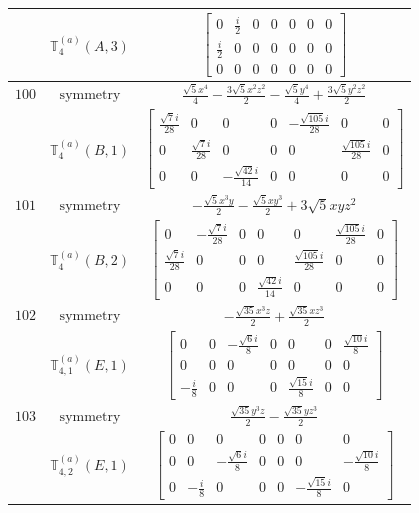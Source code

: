 \documentclass[fleqn,8pt,landscape]{jsarticle}
\begin{document}
\begin{longtable}{ccc}
$  $ & $ \mathbb{T}_{4}^{(a)}(A,3) $ & $ \begin{bmatrix} 0 & \frac{i}{2} & 0 & 0 & 0 & 0 & 0 \\ \frac{i}{2} & 0 & 0 & 0 & 0 & 0 & 0 \\ 0 & 0 & 0 & 0 & 0 & 0 & 0 \end{bmatrix} $ \\ \hline
$ 100 $ & $ \text{symmetry} $ & $ \frac{\sqrt{5} x^{4}}{4} - \frac{3 \sqrt{5} x^{2} z^{2}}{2} - \frac{\sqrt{5} y^{4}}{4} + \frac{3 \sqrt{5} y^{2} z^{2}}{2} $ \\
$  $ & $ \mathbb{T}_{4}^{(a)}(B,1) $ & $ \begin{bmatrix} \frac{\sqrt{7} i}{28} & 0 & 0 & 0 & - \frac{\sqrt{105} i}{28} & 0 & 0 \\ 0 & \frac{\sqrt{7} i}{28} & 0 & 0 & 0 & \frac{\sqrt{105} i}{28} & 0 \\ 0 & 0 & - \frac{\sqrt{42} i}{14} & 0 & 0 & 0 & 0 \end{bmatrix} $ \\ \hline
$ 101 $ & $ \text{symmetry} $ & $ - \frac{\sqrt{5} x^{3} y}{2} - \frac{\sqrt{5} x y^{3}}{2} + 3 \sqrt{5} x y z^{2} $ \\
$  $ & $ \mathbb{T}_{4}^{(a)}(B,2) $ & $ \begin{bmatrix} 0 & - \frac{\sqrt{7} i}{28} & 0 & 0 & 0 & \frac{\sqrt{105} i}{28} & 0 \\ \frac{\sqrt{7} i}{28} & 0 & 0 & 0 & \frac{\sqrt{105} i}{28} & 0 & 0 \\ 0 & 0 & 0 & \frac{\sqrt{42} i}{14} & 0 & 0 & 0 \end{bmatrix} $ \\ \hline
$ 102 $ & $ \text{symmetry} $ & $ - \frac{\sqrt{35} x^{3} z}{2} + \frac{\sqrt{35} x z^{3}}{2} $ \\
$  $ & $ \mathbb{T}_{4,1}^{(a)}(E,1) $ & $ \begin{bmatrix} 0 & 0 & - \frac{\sqrt{6} i}{8} & 0 & 0 & 0 & \frac{\sqrt{10} i}{8} \\ 0 & 0 & 0 & 0 & 0 & 0 & 0 \\ - \frac{i}{8} & 0 & 0 & 0 & \frac{\sqrt{15} i}{8} & 0 & 0 \end{bmatrix} $ \\ \hline
$ 103 $ & $ \text{symmetry} $ & $ \frac{\sqrt{35} y^{3} z}{2} - \frac{\sqrt{35} y z^{3}}{2} $ \\
$  $ & $ \mathbb{T}_{4,2}^{(a)}(E,1) $ & $ \begin{bmatrix} 0 & 0 & 0 & 0 & 0 & 0 & 0 \\ 0 & 0 & - \frac{\sqrt{6} i}{8} & 0 & 0 & 0 & - \frac{\sqrt{10} i}{8} \\ 0 & - \frac{i}{8} & 0 & 0 & 0 & - \frac{\sqrt{15} i}{8} & 0 \end{bmatrix} $ \\ \hline

\end{longtable}
\end{document}
